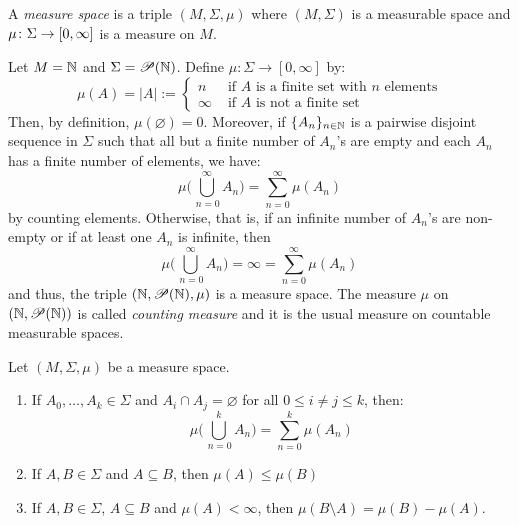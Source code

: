 \begin{definition}
A \emph{measure space} is a triple $(M,\Sigma,\mu)$ where $(M,\Sigma)$ is a measurable space and $\mu\colon\Sigma\to[0,\infty]$ is a measure on $M$.
\end{definition}

\begin{example}
  Let $M=\mathbb{N}$ and $\Sigma=\mathscr{P}(\mathbb{N})$. Define $\mu : \Sigma \to
  [0,\infty]$ by:
  \begin{equation*}
  \mu(A) = |A|:=
  \begin{cases}
  n & \text{ if $A$ is a finite set with $n$ elements}\\
  \infty & \text{ if $A$ is not a finite set}
  \end{cases}
  \end{equation*}
  Then, by definition, $\mu(\varnothing) =0$. Moreover, if $\{A_n\}_{n\in\mathbb{N}}$
  is a pairwise disjoint sequence in $\Sigma$ such that all but a
  finite number of $A_n$'s are empty and each $A_n$ has a finite
  number of elements, we have:
  \begin{equation*}
  \mu \biggl( \bigcup_{\,n=0}^{\infty}A_n\biggr) = \sum_{n=0}^{\infty}\mu(A_n)
  \end{equation*}
  by counting elements. Otherwise, that is, if an infinite number of
  $A_n$'s are non-empty or if at least one $A_n$ is infinite, then
  \begin{equation*}
  \mu \biggl( \bigcup_{\,n=0}^{\infty}A_n\biggr)
  = \infty = \sum_{n=0}^{\infty}\mu(A_n)
  \end{equation*}
  and thus, the triple $(\mathbb{N},\mathscr{P}(\mathbb{N}),\mu)$ is a measure space. The measure $\mu$ on $(\mathbb{N},\mathscr{P}(\mathbb{N}))$ is called \emph{counting measure} and it is the usual measure on countable measurable spaces.
\end{example}

\pagebreak

\begin{proposition}
Let $(M,\Sigma,\mu)$ be a measure space.
\begin{enumerate}[label=(\roman*)]
\item If $A_0,\ldots,A_k \in \Sigma$ and $A_i \cap A_j = \varnothing$ for all $0\leq i\neq j\leq k$, then:
\begin{equation*}
\mu \biggl( \bigcup_{\,n=0}^{k}A_n\biggr) = \sum_{n=0}^{k}\mu(A_n)
\end{equation*}
\item If $A,B\in \Sigma$ and $A \subseteq B$, then $\mu(A) \leq \mu(B)$
\item If $A,B \in \Sigma$, $A \subseteq B$ and $\mu(A)<\infty$, then $ \mu(B\setminus A)=\mu(B)-\mu(A)$.
\end{enumerate}
\end{proposition}

